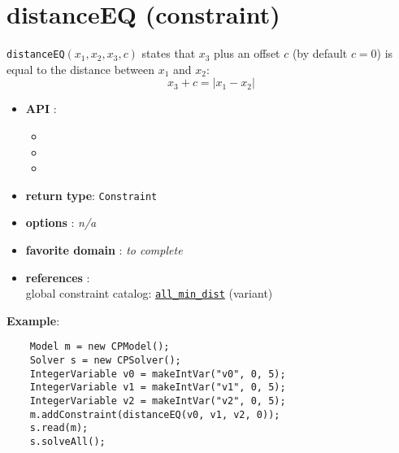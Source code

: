 \label{distanceeq}
\hypertarget{distanceeq}{}

\section{distanceEQ (constraint)}\label{distanceeq:distanceeqconstraint}\hypertarget{distanceeq:distanceeqconstraint}{}
\begin{notedef}
  \texttt{distanceEQ}$(x_1,x_2,x_3,c)$ states that $x_3$ plus an offset $c$ (by default $c=0$) is equal to the distance between $x_1$ and $x_2$:
$$ x_3 + c = | x_1 - x_2 |$$
\end{notedef}

\begin{itemize}
	\item \textbf{API} :
	\begin{itemize}
		\item {}
		\item {}
		\item {}
	\end{itemize}
	\item \textbf{return type}: \texttt{Constraint}
	\item \textbf{options} : \emph{n/a}
	\item \textbf{favorite domain} : \emph{to complete}
	\item \textbf{references} :\\
      global constraint catalog: \href{http://www.emn.fr/x-info/sdemasse/gccat/Call_min_dist.html}{\tt all\_min\_dist} (variant)
\end{itemize}

\textbf{Example}:
\begin{lstlisting}
	Model m = new CPModel();
	Solver s = new CPSolver();
	IntegerVariable v0 = makeIntVar("v0", 0, 5);
	IntegerVariable v1 = makeIntVar("v1", 0, 5);
	IntegerVariable v2 = makeIntVar("v2", 0, 5);
	m.addConstraint(distanceEQ(v0, v1, v2, 0));
	s.read(m);
	s.solveAll();
\end{lstlisting}
